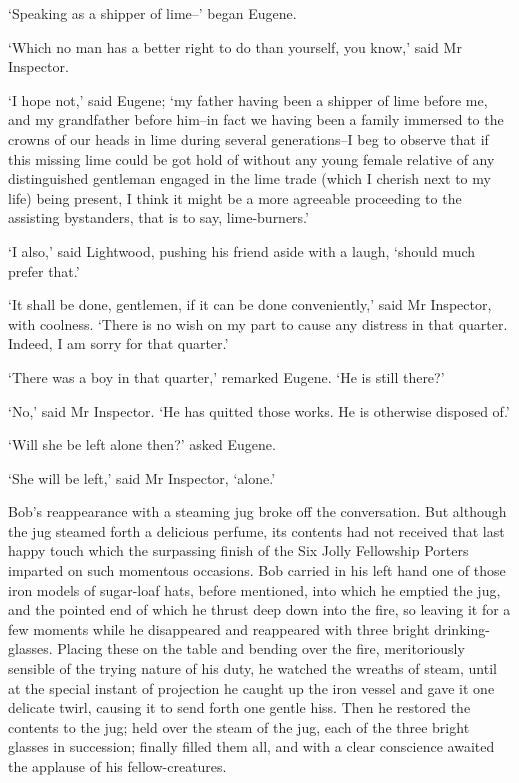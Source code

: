 ‘Speaking as a shipper of lime--’ began Eugene.

‘Which no man has a better right to do than yourself, you know,’ said Mr
Inspector.

‘I hope not,’ said Eugene; ‘my father having been a shipper of lime
before me, and my grandfather before him--in fact we having been a
family immersed to the crowns of our heads in lime during several
generations--I beg to observe that if this missing lime could be got
hold of without any young female relative of any distinguished gentleman
engaged in the lime trade (which I cherish next to my life) being
present, I think it might be a more agreeable proceeding to the
assisting bystanders, that is to say, lime-burners.’

‘I also,’ said Lightwood, pushing his friend aside with a laugh, ‘should
much prefer that.’

‘It shall be done, gentlemen, if it can be done conveniently,’ said
Mr Inspector, with coolness. ‘There is no wish on my part to cause any
distress in that quarter. Indeed, I am sorry for that quarter.’

‘There was a boy in that quarter,’ remarked Eugene. ‘He is still there?’

‘No,’ said Mr Inspector. ‘He has quitted those works. He is otherwise
disposed of.’

‘Will she be left alone then?’ asked Eugene.

‘She will be left,’ said Mr Inspector, ‘alone.’

Bob’s reappearance with a steaming jug broke off the conversation. But
although the jug steamed forth a delicious perfume, its contents had not
received that last happy touch which the surpassing finish of the Six
Jolly Fellowship Porters imparted on such momentous occasions. Bob
carried in his left hand one of those iron models of sugar-loaf hats,
before mentioned, into which he emptied the jug, and the pointed end of
which he thrust deep down into the fire, so leaving it for a few moments
while he disappeared and reappeared with three bright drinking-glasses.
Placing these on the table and bending over the fire, meritoriously
sensible of the trying nature of his duty, he watched the wreaths of
steam, until at the special instant of projection he caught up the iron
vessel and gave it one delicate twirl, causing it to send forth one
gentle hiss. Then he restored the contents to the jug; held over the
steam of the jug, each of the three bright glasses in succession;
finally filled them all, and with a clear conscience awaited the
applause of his fellow-creatures.

